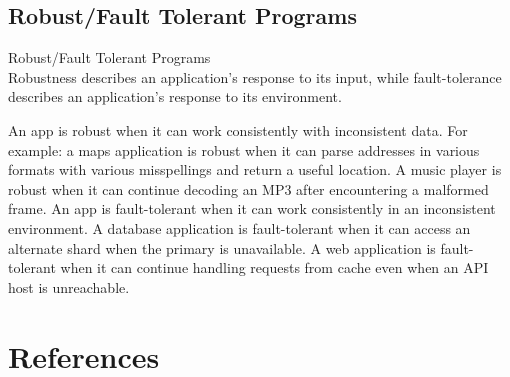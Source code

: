 \documentclass{article}
\begin{document}
 



 \subsection{Robust/Fault Tolerant Programs}
 Robust/Fault Tolerant Programs\\
Robustness describes an application's response to its input, while fault-tolerance describes an application's response to its environment. 

An app is robust when it can work consistently with inconsistent data. For example: a maps application is robust when it can parse addresses in various formats with various misspellings and return a useful location. A music player is robust when it can continue decoding an MP3 after encountering a malformed frame. 
An app is fault-tolerant when it can work consistently in an inconsistent environment. A database application is fault-tolerant when it can access an alternate shard when the primary is unavailable. A web application is fault-tolerant when it can continue handling requests from cache even when an API host is unreachable.

\newpage

\section{References}
\printbibliography[heading=none]
\end{document}
